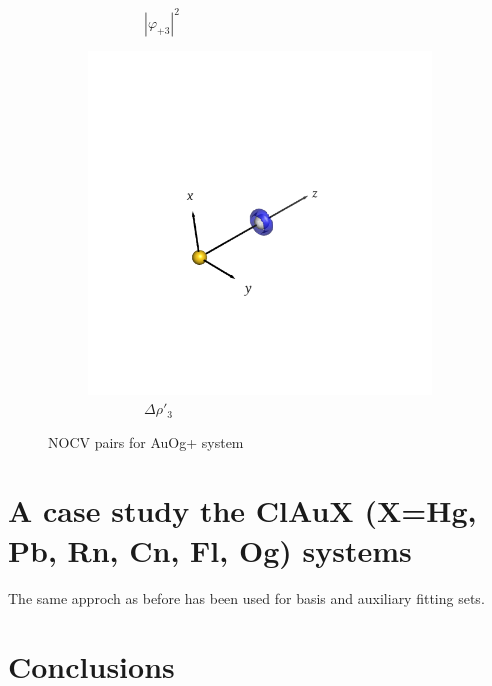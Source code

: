 \documentclass[journal=inoraj,manuscript=article]{achemso}
\begin{document}
\begin{figure}[!h]
\begin{subfigure}[t]{0.32\textwidth}
        \caption*{\ \ \ \ \ \ \ \ $|\varphi_{+3}|^2$} 
    \end{subfigure}
    \hfill
    \begin{subfigure}[t]{0.32\textwidth}
        \centering
        \includegraphics[width=\linewidth]{./AuOg+/pair5.png} 
        \caption*{\ \ \ \ \ \ \ \ $\Delta \rho'_3$} 
    \end{subfigure}

\caption{NOCV pairs for AuOg+ system}
\end{figure}


\section{A case study the ClAuX (X=Hg, Pb, Rn, Cn, Fl, Og) systems  }


The same approch as before has been used for basis and auxiliary fitting sets.


\section{Conclusions}
\end{document}
